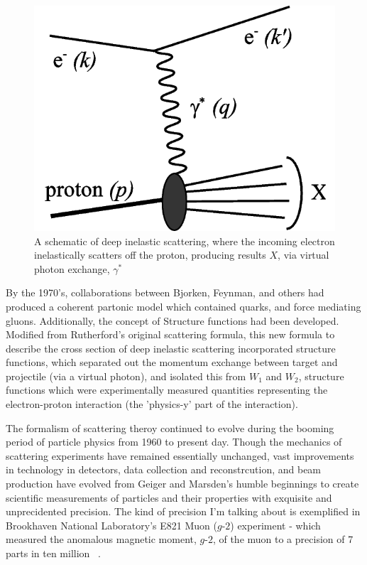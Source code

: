 \begin{figure}[ht]
	\centering
	\includegraphics[width=0.6\linewidth]{../Chapter2/fig/deep_inelastic_basic.png}
	\caption{
		A schematic of deep inelastic scattering, where the incoming electron
		inelastically scatters off the proton, producing results $X$, via virtual
		photon exchange, $\gamma^*$ ~\cite{Ddn2_2008}
	}
	\label{fig:disschematic}
\end{figure}

By the 1970's, collaborations between Bjorken, Feynman, and others had produced a
coherent partonic model which contained quarks, and force mediating gluons.
Additionally, the concept of Structure functions had been developed. Modified
from Rutherford's original scattering formula, this new formula to describe the
cross section of deep inelastic scattering incorporated structure functions,
which separated out the momentum exchange between target and projectile (via a
virtual photon), and isolated this from $W_1$ and $W_2$, structure functions
which were experimentally measured quantities representing the electron-proton
interaction (the 'physics-y' part of the interaction).

The formalism of scattering theroy continued to evolve during the booming period
of particle physics from 1960 to present day. Though the mechanics of scattering
experiments have remained essentially unchanged, vast improvements in technology
in detectors, data collection and reconstrcution, and beam production have
evolved from Geiger and Marsden's humble beginnings to create scientific
measurements of particles and their properties with exquisite and unprecidented
precision. The kind of precision I'm talking about is exemplified in Brookhaven
National Laboratory's E821 Muon ($g$-$2$) experiment - which measured the
anomalous magnetic moment, $g$-$2$, of the muon to a precision of 7 parts in ten
million ~\cite{Bennett}.


